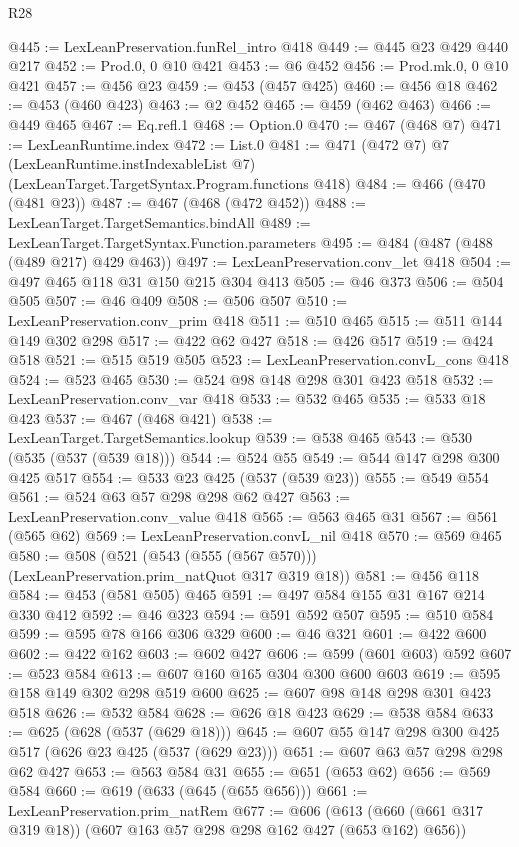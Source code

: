 \begin{lexlean}{R28}
\begin{coremodule}
@445 := LexLeanPreservation.funRel_intro @418
@449 := @445 @23 @429 @440 @217
@452 := Prod.{0, 0} @10 @421
@453 := @6 @452
@456 := Prod.mk.{0, 0} @10 @421
@457 := @456 @23
@459 := @453 (@457 @425)
@460 := @456 @18
@462 := @453 (@460 @423)
@463 := @2 @452
@465 := @459 (@462 @463)
@466 := @449 @465
@467 := Eq.refl.{1}
@468 := Option.{0}
@470 := @467 (@468 @7)
@471 := LexLeanRuntime.index
@472 := List.{0}
@481 := @471
    (@472 @7)
    @7
    (LexLeanRuntime.instIndexableList @7)
    (LexLeanTarget.TargetSyntax.Program.functions @418)
@484 := @466 (@470 (@481 @23))
@487 := @467 (@468 (@472 @452))
@488 := LexLeanTarget.TargetSemantics.bindAll
@489 := LexLeanTarget.TargetSyntax.Function.parameters
@495 := @484 (@487 (@488 (@489 @217) @429 @463))
@497 := LexLeanPreservation.conv_let @418
@504 := @497 @465 @118 @31 @150 @215 @304 @413
@505 := @46 @373
@506 := @504 @505
@507 := @46 @409
@508 := @506 @507
@510 := LexLeanPreservation.conv_prim @418
@511 := @510 @465
@515 := @511 @144 @149 @302 @298
@517 := @422 @62 @427
@518 := @426 @517
@519 := @424 @518
@521 := @515 @519 @505
@523 := LexLeanPreservation.convL_cons @418
@524 := @523 @465
@530 := @524 @98 @148 @298 @301 @423 @518
@532 := LexLeanPreservation.conv_var @418
@533 := @532 @465
@535 := @533 @18 @423
@537 := @467 (@468 @421)
@538 := LexLeanTarget.TargetSemantics.lookup
@539 := @538 @465
@543 := @530 (@535 (@537 (@539 @18)))
@544 := @524 @55
@549 := @544 @147 @298 @300 @425 @517
@554 := @533 @23 @425 (@537 (@539 @23))
@555 := @549 @554
@561 := @524 @63 @57 @298 @298 @62 @427
@563 := LexLeanPreservation.conv_value @418
@565 := @563 @465 @31
@567 := @561 (@565 @62)
@569 := LexLeanPreservation.convL_nil @418
@570 := @569 @465
@580 := @508 (@521 (@543 (@555 (@567 @570))) (LexLeanPreservation.prim_natQuot @317 @319 @18))
@581 := @456 @118
@584 := @453 (@581 @505) @465
@591 := @497 @584 @155 @31 @167 @214 @330 @412
@592 := @46 @323
@594 := @591 @592 @507
@595 := @510 @584
@599 := @595 @78 @166 @306 @329
@600 := @46 @321
@601 := @422 @600
@602 := @422 @162
@603 := @602 @427
@606 := @599 (@601 @603) @592
@607 := @523 @584
@613 := @607 @160 @165 @304 @300 @600 @603
@619 := @595 @158 @149 @302 @298 @519 @600
@625 := @607 @98 @148 @298 @301 @423 @518
@626 := @532 @584
@628 := @626 @18 @423
@629 := @538 @584
@633 := @625 (@628 (@537 (@629 @18)))
@645 := @607 @55 @147 @298 @300 @425 @517 (@626 @23 @425 (@537 (@629 @23)))
@651 := @607 @63 @57 @298 @298 @62 @427
@653 := @563 @584 @31
@655 := @651 (@653 @62)
@656 := @569 @584
@660 := @619 (@633 (@645 (@655 @656)))
@661 := LexLeanPreservation.prim_natRem
@677 := @606 (@613 (@660 (@661 @317 @319 @18)) (@607 @163 @57 @298 @298 @162 @427 (@653 @162) @656))

\end{coremodule}
\end{lexlean}
